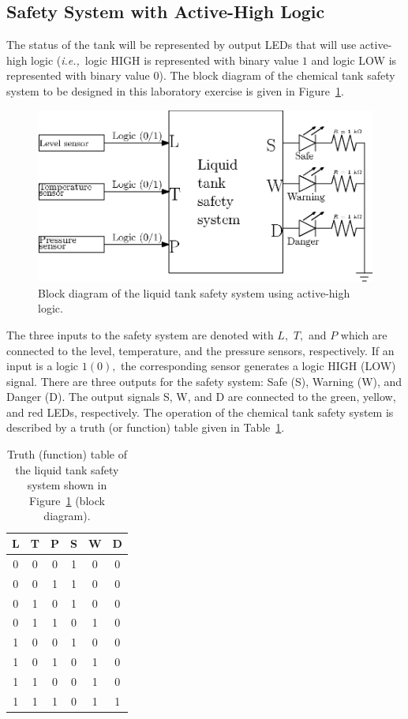 \subsection{Safety System with Active-High Logic}
\label{sec:safetySystemAH}
The status of the tank will be represented by output LEDs that will use active-high logic (\textit{i.e.,}~logic HIGH is represented with binary value $1$ and logic LOW is represented with binary value $0$). The block diagram of the chemical tank safety system to be designed in this laboratory exercise is given in Figure~\ref{fig:safetySysNoClock}.
%
\begin{figure}[h]
    \centering
    \includegraphics{figs/ipe/lab_10/safetySysNoClock.eps}
    \caption{Block diagram of the liquid tank safety system using active-high logic.}
    \label{fig:safetySysNoClock}
\end{figure}
%
The three inputs to the safety system are denoted with $L,$ $T,$ and $P$ which are connected to the level, temperature, and the pressure sensors, respectively. If an input is a logic $1 (0),$ the corresponding sensor generates a logic HIGH (LOW) signal. There are three outputs for the safety system: Safe (S), Warning (W), and Danger (D). The output signals S, W, and D are connected to the green, yellow, and red LEDs, respectively. The operation of the chemical tank safety system is described by a truth (or function) table given in Table~\ref{tab:truthTableTank1}. %
%
\begin{table}  
  \centering
  \caption{Truth (function) table  of the liquid tank safety system shown in Figure~\ref{fig:safetySysNoClock} (block diagram).}  
  \begin{tabular}{ccc|c|c|c}
    \toprule
    L & T & P & S & W & D\\
    \toprule
    0 & 0 & 0 & 1 & 0 & 0 \\
    0 & 0 & 1 & 1 & 0 & 0 \\
    0 & 1 & 0 & 1 & 0 & 0 \\
    0 & 1 & 1 & 0 & 1 & 0 \\
    1 & 0 & 0 & 1 & 0 & 0 \\
    1 & 0 & 1 & 0 & 1 & 0 \\
    1 & 1 & 0 & 0 & 1 & 0 \\
    1 & 1 & 1 & 0 & 1 & 1 \\
    \bottomrule
  \end{tabular}
  \label{tab:truthTableTank1}
\end{table}
